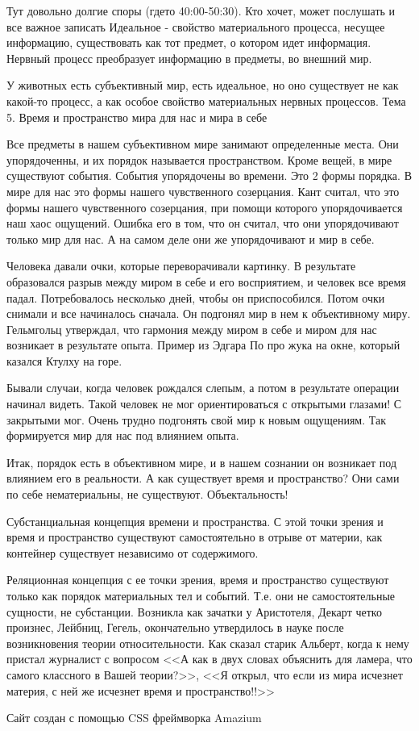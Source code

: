 Тут довольно долгие споры (гдето 40:00-50:30). Кто хочет, может послушать и все важное записать Идеальное - свойство материального процесса, несущее информацию, существовать как тот предмет, о котором идет информация. Нервный процесс преобразует информацию в предметы, во внешний мир.

У животных есть субъективный мир, есть идеальное, но оно существует не как какой-то процесс, а как особое свойство материальных нервных процессов.
Тема 5. Время и пространство мира для нас и мира в себе

Все предметы в нашем субъективном мире занимают определенные места. Они упорядоченны, и их порядок называется пространством. Кроме вещей, в мире существуют события. События упорядочены во времени. Это 2 формы порядка. В мире для нас это формы нашего чувственного созерцания. Кант считал, что это формы нашего чувственного созерцания, при помощи которого упорядочивается наш хаос ощущений. Ошибка его в том, что он считал, что они упорядочивают только мир для нас. А на самом деле они же упорядочивают и мир в себе.

Человека давали очки, которые переворачивали картинку. В результате образовался разрыв между миром в себе и его восприятием, и человек все время падал. Потребовалось несколько дней, чтобы он приспособился. Потом очки снимали и все начиналось сначала. Он подгонял мир в нем к объективному миру. Гельмгольц утверждал, что гармония между миром в себе и миром для нас возникает в результате опыта. Пример из Эдгара По про жука на окне, который казался Ктулху на горе.

Бывали случаи, когда человек рождался слепым, а потом в результате операции начинал видеть. Такой человек не мог ориентироваться с открытыми глазами! С закрытыми мог. Очень трудно подгонять свой мир к новым ощущениям. Так формируется мир для нас под влиянием опыта.

Итак, порядок есть в объективном мире, и в нашем сознании он возникает под влиянием его в реальности. А как существует время и пространство? Они сами по себе нематериальны, не существуют. Объектальность!

    Субстанциальная концепция времени и пространства. С этой точки зрения и время и пространство существуют самостоятельно в отрыве от материи, как контейнер существует независимо от содержимого.

    Реляционная концепция с ее точки зрения, время и пространство существуют только как порядок материальных тел и событий. Т.е. они не самостоятельные сущности, не субстанции. Возникла как зачатки у Аристотеля, Декарт четко произнес, Лейбниц, Гегель, окончательно утвердилось в науке после возникновения теории относительности. Как сказал старик Альберт, когда к нему пристал журналист с вопросом <<А как в двух словах объяснить для ламера, что самого классного в Вашей теории?>>, <<Я открыл, что если из мира исчезнет материя, с ней же исчезнет время и пространство!!>>

Сайт создан с помощью CSS фреймворка Amazium
